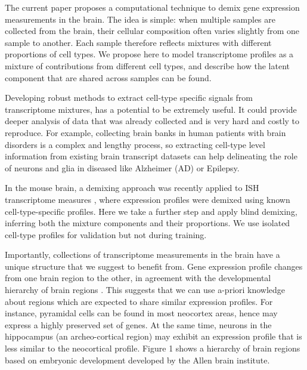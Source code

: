 \documentclass{article} %
\begin{document}
The current paper proposes a computational technique to demix gene expression measurements in the brain. The idea is simple: when multiple samples are collected from the brain, their cellular composition often varies slightly from one sample to another. Each sample therefore reflects mixtures with different proportions of cell types. We propose here to model transcriptome profiles as a mixture of contributions from different cell types, and describe how the latent component that are shared across samples can be found.

Developing robust methods to extract cell-type specific signals from transcriptome mixtures, has a potential to be extremely useful. It could provide deeper analysis of data that was already collected and is very hard and costly to reproduce. For example, collecting brain banks in human patients with brain disorders is a complex and lengthy process, so extracting cell-type level information from existing brain transcript datasets can help delineating the role of neurons and glia in diseased like Alzheimer (AD) or Epilepsy.

In the mouse brain, a demixing approach was recently applied to ISH transcriptome measures \cite{grange2014cell}, where expression profiles were demixed using known cell-type-specific profiles. Here we take a further step and apply blind demixing, inferring both the mixture components and their proportions. We use isolated cell-type profiles for validation but not during training. 


Importantly, collections of transcriptome measurements in the brain have a unique structure that we suggest to benefit from. Gene expression profile changes from one brain region to the other, in agreement with the developmental hierarchy of brain regions \cite{zapala2005}. This suggests that we can use a-priori knowledge about regions which are expected to share similar expression profiles. For instance, pyramidal cells can be found in most neocortex areas, hence may express a highly preserved set of genes. At the same time, neurons in the hippocampus (an archeo-cortical region) may exhibit an expression profile that is less similar to the neocortical profile. Figure 1 shows a hierarchy of brain regions based on embryonic development developed by the Allen brain institute. 
\end{document}

